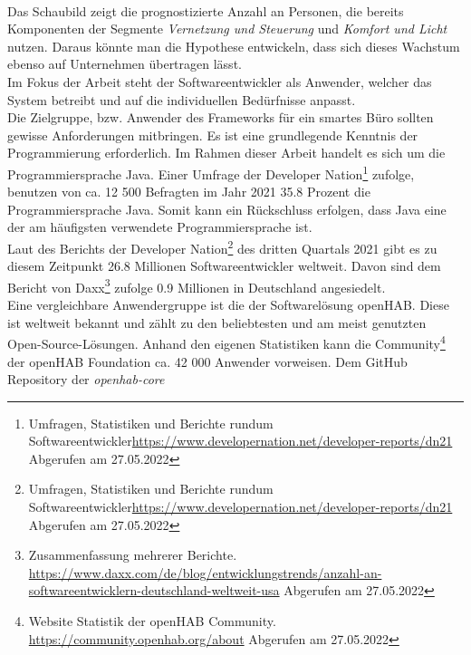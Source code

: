         \\
        Das Schaubild zeigt die prognostizierte Anzahl an Personen, die bereits Komponenten der Segmente 
        \textit{Vernetzung und Steuerung} und \textit{Komfort und Licht} nutzen. Daraus könnte man die Hypothese entwickeln, dass sich dieses Wachstum 
        ebenso auf Unternehmen übertragen lässt. 
        \\
        \linebreak
        Im Fokus der Arbeit steht der Softwareentwickler als Anwender, welcher das System betreibt und auf die 
        individuellen Bedürfnisse anpasst. 
        \\
        Die Zielgruppe, bzw. Anwender des Frameworks für ein smartes Büro sollten gewisse Anforderungen mitbringen.
        Es ist eine grundlegende Kenntnis der Programmierung erforderlich. Im Rahmen dieser Arbeit handelt es sich 
        um die Programmiersprache Java. Einer Umfrage der Developer Nation\footnote{Umfragen, Statistiken und Berichte rundum Softwareentwickler\url{https://www.developernation.net/developer-reports/dn21} Abgerufen am 27.05.2022} 
        zufolge, benutzen von ca. 12 500 Befragten im Jahr 2021 35.8 Prozent die Programmiersprache Java. Somit kann 
        ein Rückschluss erfolgen, dass Java eine der am häufigsten verwendete Programmiersprache ist.
        \\
        \linebreak
        Laut des Berichts der Developer Nation\footnote{Umfragen, Statistiken und Berichte rundum Softwareentwickler\url{https://www.developernation.net/developer-reports/dn21} Abgerufen am 27.05.2022}
        des dritten Quartals 2021 gibt es zu diesem Zeitpunkt 26.8 Millionen Softwareentwickler weltweit. Davon sind dem 
        Bericht von Daxx\footnote{Zusammenfassung mehrerer Berichte. \url{https://www.daxx.com/de/blog/entwicklungstrends/anzahl-an-softwareentwicklern-deutschland-weltweit-usa} Abgerufen am 27.05.2022}
        zufolge 0.9 Millionen in Deutschland angesiedelt. 
        \\
        \linebreak
        Eine vergleichbare Anwendergruppe ist die der Softwarelösung openHAB. Diese ist weltweit bekannt und zählt zu den 
        beliebtesten und am meist genutzten Open-Source-Lösungen. Anhand den eigenen Statistiken kann die Community\footnote{Website Statistik der openHAB Community. \url{https://community.openhab.org/about} Abgerufen am 27.05.2022} 
        der openHAB Foundation ca. 42 000 Anwender vorweisen. Dem GitHub Repository der \textit{openhab-core} 
